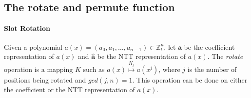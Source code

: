 \subsection{The rotate and permute function}
\label{sec:6rotate}

\paragraph{Slot Rotation}

Given a polynomial
\(a(x) = (a_{0}, a_{1}, \dots, a_{n-1}) \in \mathbb{Z}_{t}^{n}\), let
\(\mathbf{a}\) be the coefficient representation of \(a(x)\) and
\(\hat{\mathbf{a}}\) be the NTT representation of \(a(x)\). The \textit{rotate}
operation is a mapping \(K\) such as
\(a(x) \stackrel{K_{j}}{\mapsto} a(x^{j})\), where \(j\) is the number of
positions being rotated and \(gcd(j,n) = 1\). This operation can be done on
either the coefficient or the NTT representation of \(a(x)\).
